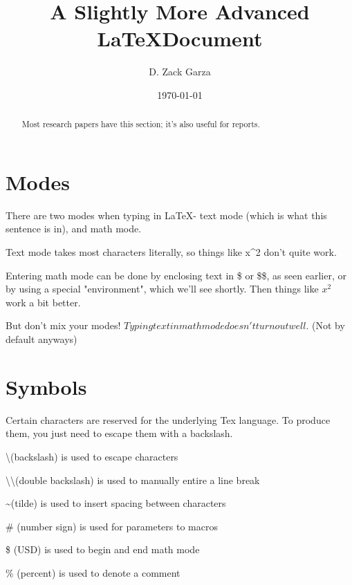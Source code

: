 \documentclass{article}
\author{D. Zack Garza}
\title{A Slightly More Advanced \LaTeX Document}
\date{\today}
\begin{document}
\maketitle
\newpage
\tableofcontents
\newpage



\begin{abstract}
    Most research papers have this section; it's also useful for reports.
\end{abstract}


\section{Modes}
    There are two modes when typing in \LaTeX - text mode (which is what this sentence is in), and math mode.
    
    Text mode takes most characters literally, so things like x^2 don't quite work.
    
    Entering math mode can be done by enclosing text in \$ or \$\$, as seen earlier, or by using a special "environment", which we'll see shortly. Then things like $x^2$ work a bit better.
    
    But don't mix your modes! $Typing text in math mode doesn't turn out well.$ (Not by default anyways)


\section{Symbols}
    Certain characters are reserved for the underlying Tex language. To produce them, you just need to escape them with a backslash.

    \textbackslash (backslash) is used to escape characters
    
    \textbackslash\textbackslash (double backslash) is used to manually entire a line break
    
    \textasciitilde (tilde) is used to insert spacing between characters
    
    \# (number sign) is used for parameters to macros
    
    \$ (USD) is used to begin and end math mode
    
    \% (percent) is used to denote a comment
    
\end{document}
